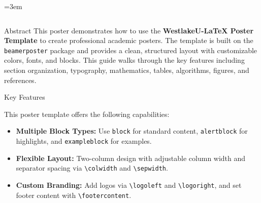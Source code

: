 
\emergencystretch=3em


\begin{frame}[t]
\fontsize{32}{36}\selectfont

\begin{columns}[t]
\separatorcolumn

\begin{column}{\colwidth}
  \begin{block}{Abstract}
    This poster demonstrates how to use the \textbf{WestlakeU-LaTeX Poster Template} to create 
    professional academic posters. The template is built on the \texttt{beamerposter} package 
    and provides a clean, structured layout with customizable colors, fonts, and blocks. 
    This guide walks through the key features including section organization, typography, 
    mathematics, tables, algorithms, figures, and references.
  \end{block}

 \begin{alertblock}{Key Features}

   This poster template offers the following capabilities:

   \begin{itemize}
     \item \textbf{Multiple Block Types:} Use \texttt{block} for standard content, 
           \texttt{alertblock} for highlights, and \texttt{exampleblock} for examples.

     \item \textbf{Flexible Layout:} Two-column design with adjustable column width 
           and separator spacing via \texttt{\textbackslash colwidth} and \texttt{\textbackslash sepwidth}.

     \item \textbf{Custom Branding:} Add logos via \texttt{\textbackslash logoleft} and 
           \texttt{\textbackslash logoright}, and set footer content with \texttt{\textbackslash footercontent}.
   \end{itemize}


\end{alertblock}
\end{column}
\end{columns}
\end{frame}
